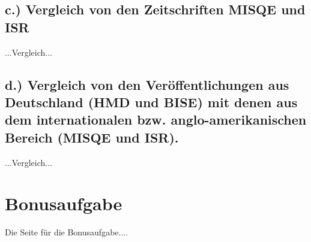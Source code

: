 \documentclass[12pt,utf8]{scrartcl}
\begin{document}
\begin{flushleft}
\subsection{\label{sub3:einfuehrung}c.) Vergleich von den Zeitschriften MISQE und ISR}

...Vergleich...

\subsection{\label{sub4:einfuehrung}d.) Vergleich von den Veröffentlichungen aus Deutschland (HMD und BISE) mit denen aus dem internationalen bzw. anglo-amerikanischen Bereich (MISQE und ISR).}

...Vergleich...


\newpage
\section{\label{sec:bonus}Bonusaufgabe}

Die Seite für die Bonusaufgabe....


\newpage
{}



\end{flushleft}
\end{document}
